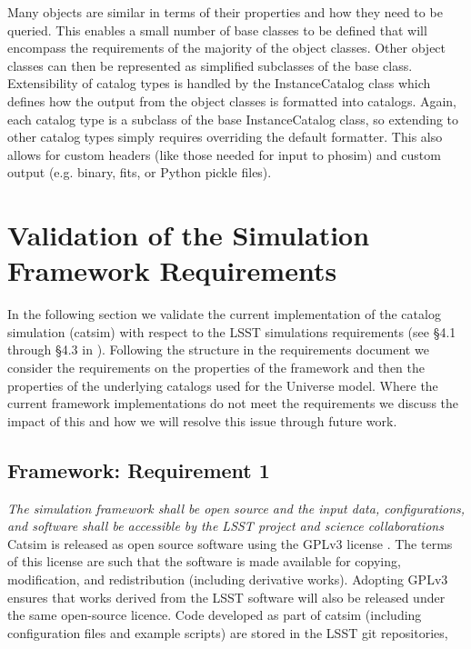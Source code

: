 \documentclass[]{article}
\begin{document}
Many objects are similar in terms of their properties and how they
need to be queried.  This enables a small number of base classes to be
defined that will encompass the requirements of the majority of the
object classes.  Other object classes can then be represented as
simplified subclasses of the base class.  
Extensibility of catalog types is handled by the InstanceCatalog class
which defines how the output from the object classes is formatted into
catalogs.  Again, each catalog  type is a subclass of the base
InstanceCatalog class, so extending to other catalog types simply
requires overriding the default formatter.  This also allows for
custom headers (like those needed for input to phosim) and custom
output (e.g. binary, fits, or Python pickle files).



\section{Validation of the Simulation Framework Requirements}

In the following section we validate the current implementation of the
catalog simulation (catsim) with respect to the LSST simulations
requirements (see \S 4.1 through \S 4.3 in
\citealt{requirements}). Following the structure in the requirements
document we consider the requirements on the properties of the
framework and then the properties of the underlying catalogs used for
the Universe model.  Where the current framework implementations do
not meet the requirements we discuss the impact of this and how we
will resolve this issue through future work.

\subsection{Framework: Requirement 1}

{\it  The simulation framework shall be open source and the input data, configurations,
and software shall be accessible by the LSST project and science
collaborations}\\

Catsim is released as open source software using the GPLv3 license
\citep{XXX}. The terms of this license are such that the software is
made available for copying, modification, and redistribution
(including derivative works). Adopting GPLv3 ensures that works
derived from the LSST software will also be released under the same
open-source licence. Code developed as part of catsim (including
configuration files and example scripts) are stored in the LSST 
git repositories,
\end{document}
